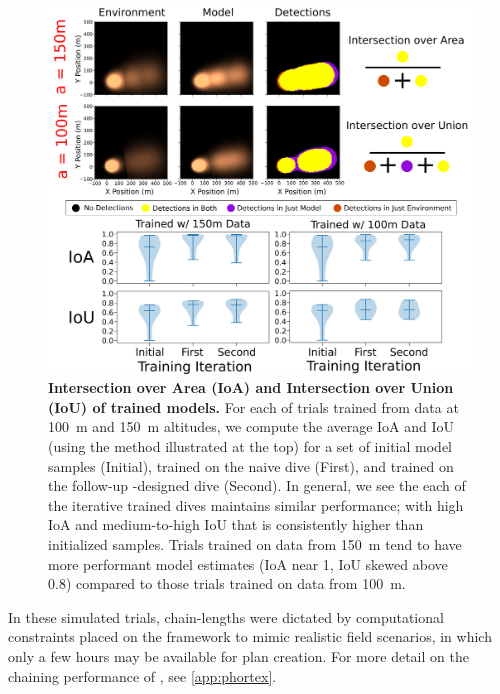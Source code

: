 \begin{figure}[h!]
    \centering
    \includegraphics[width=0.9\columnwidth]{figures/sim_mod_performance.png}
    \caption[Intersection over Area and Intersection over Union of trained models.]{\textbf{Intersection over Area (IoA) and Intersection over Union (IoU) of trained models.} For each of trials trained from data at \SI{100}{\meter} and \SI{150}{\meter} altitudes, we compute the average IoA and IoU (using the method illustrated at the top) for a set of initial model samples (Initial), \PHUMES trained on the naive dive (First), and \PHUMES trained on the follow-up \PHORTEX-designed dive (Second). In general, we see the each of the iterative trained dives maintains similar performance; with high IoA and medium-to-high IoU that is consistently higher than initialized samples. Trials trained on data from \SI{150}{\meter} tend to have more performant model estimates (IoA near 1, IoU skewed above 0.8) compared to those trials trained on data from \SI{100}{\meter}.}
    \label{fig:sim_phumes_perform}
\end{figure}

In these simulated trials, chain-lengths were dictated by computational constraints placed on the framework to mimic realistic field scenarios, in which only a few hours may be available for plan creation. For more detail on the chaining performance of \PHUMES, see \cref{app:phortex}.


